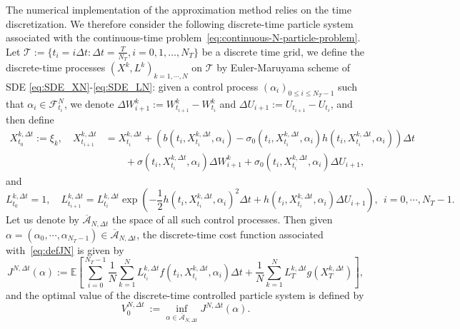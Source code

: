 \documentclass[11pt]{article}
\numberwithin{equation}{section}
\theoremstyle{plain}
\theoremstyle{definition}
\theoremstyle{remark}
\newcommand{\Fc}{\mathcal{F}}
\begin{document}
	The numerical implementation of the approximation method relies on the time discretization.
	We therefore consider the following discrete-time particle system associated with the continuous-time problem~\eqref{eq:continuous-N-particle-problem}. 
	Let $\mathcal{T}:=\{t_i=i\Delta t: \Delta t = \frac{T}{N_T}, i=0,1,\dots, N_T\}$ be a discrete time grid, we define the discrete-time processes $(X^k, L^k)_{k = 1, \cdots, N}$ on $\mathcal{T}$ by Euler-Maruyama scheme of SDE \eqref{eq:SDE_XN}-\eqref{eq:SDE_LN}: 
	given a control process $(\alpha_i)_{0 \le i \le N_T-1}$ such that $\alpha_i \in \Fc^N_{t_i}$, we denote $\Delta W^k_{i+1} := W^k_{t_{i+1}} - W^k_{t_i}$ and $\Delta U_{i+1} := U_{t_{i+1}} - U_{t_i}$,
	and then define
	\begin{align} \label{eq:SDE_X_euler}
		X^{k,\Delta t}_{t_0} := \xi_k,
		\quad
		X_{t_{i+1}}^{k,\Delta t} &= X_{t_i}^{k,\Delta t} + \left(b(t_i, X_{t_i}^{k,\Delta t}, \alpha_i) - \sigma_0(t_i,X_{t_i}^{k,\Delta t}, \alpha_i)h(t_i,X_{t_i}^{k,\Delta t}, \alpha_i) \right)\Delta t  \nonumber \\
		&\qquad  + \sigma(t_i, X_{t_i}^{k,\Delta t}, \alpha_i)\Delta W_{i+1}^k + \sigma_0(t_i,X_{t_i}^{k,\Delta t}, \alpha_i)\Delta U_{i+1},
	\end{align}
	and
	\begin{equation} \label{eq:SDE_L_euler}
		L^{k,\Delta t}_{t_0} = 1,
		\quad 
		L_{t_{i+1}}^{k,\Delta t} = L_{t_i}^{k,\Delta t}\exp\left( -\frac{1}{2}h(t_i, X_{t_i}^{k,\Delta t}, \alpha_i)^2\Delta t + h(t_i, X_{t_i}^{k,\Delta t}, \alpha_i)\Delta U_{i+1} \right),
		~~i=0, \cdots, N_T-1.
	\end{equation}
	Let us denote by $\overline{\mathcal{A}}_{N, \Delta t}$ the space of all such control processes. 
	Then given $\alpha = (\alpha_0, \cdots, \alpha_{N_T-1}) \in \overline{\mathcal{A}}_{N, \Delta t}$, the discrete-time cost function associated with~\eqref{eq:defJN} is given by 
	\begin{equation}\label{eq:discrete-time-prob}
		J^{N,\Delta t}(\alpha)
		:= 
		\mathbb{E}\left[ \sum_{i=0}^{N_T-1} \frac{1}{N}\sum_{k=1}^N L_{t_i}^{k,\Delta t} f(t_i, X_{t_i}^{k,\Delta t},  \alpha_i) \Delta t +\frac{1}{N}\sum_{k=1}^N L_T^{k,\Delta t} g(X_T^{k,\Delta t}) \right], 
	\end{equation}
	and the optimal value of the discrete-time controlled particle system is defined by 
	\begin{equation} \label{eq:def_V0NDt}
		V_0^{N,\Delta t} 
		~:=
		\inf_{\alpha \in \overline{\mathcal{A}}_{N, \Delta t}} J^{N, \Delta t}(\alpha). 
	\end{equation}
	
\end{document}
